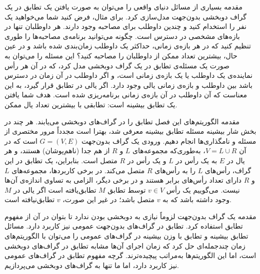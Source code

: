 \begin{itemframe}{مقدمه}
\itm
بسیاری از مسائل دنیای واقعی را می‌توان به صورت یافتن یک تطابق در یک گراف دوبخشی بدون‌جهت مدل‌سازی کرد.
\itm
برای مثال، فرض کنید شما می‌خواهید یک نفر را استخدام کنید و چندین داوطلب برای مصاحبه وجود دارند.
هر داوطلبان تنها در بازه‌های مشخصی در دسترس است. چگونه می‌توانید برنامه‌ی مصاحبه‌ها را طوری تنظیم کنید که در هر بازه‌ی زمانی، حداکثر یک داوطلب زمان‌بندی شده باشد و در عین حال، بیشترین تعداد ممکن از داوطلبان را مصاحبه کنید؟
\itm
 این مسئله را می‌توان به صورت یک مسئله‌ی تطابق در یک گراف دو‌بخشی مدل کرد، که در آن هر رأس نماینده‌ی یک داوطلب یا یک بازه‌ی زمانی است، و اگر داوطلب در آن زمان در دسترس باشد بین داوطلب و بازه‌ی زمانی یالی وجود دارد.
\itm
اگر یالی در تطابق قرار گیرد، به این معناست که آن داوطلب در آن بازه‌ی زمانی برنامه‌ریزی شده است. هدف شما یافتن یک تطابق بیشینه است: تطابقی با بیشترین تعداد یال ممکن.
\end{itemframe}

\begin{itemframe}{مقدمه}
\itm
الگوریتم‌های این فصل تطابق را در گراف‌های دو‌بخشی می‌یابند. هر چند در بخش شار بیشینه مسئله تطابق بیشینه معرفی شد، بهترا است مجدداً مرور مختصری از مسئله و نامگذاری‌ها انجام دهیم.
\itm
ورودی یک گراف بدون‌جهت $G = (V, E)$ است که در آن $V = L \cup R$، به‌طوری‌که مجموعه‌های $L$ و $R$ از هم جدا (ناهم‌پوشان) هستند، و هر یال در $E$ به یک رأس در $L$ و یک رأس در $R$ متصل است. بنابراین، یک تطابق در این گراف، رأس‌های $L$ را به رأس‌های $R$ متصل می‌کند.
\itm
در برخی کاربردها، مجموعه‌های $L$ و $R$ دارای تعداد رأس‌های برابر هستند و در برخی دیگر، الزامی به تساوی اندازه‌ی آن‌ها نیست.
\itm
می‌گوییم یک رأس $v \in V$ توسط تطابق $M$ تطابق‌یافته
 است اگر یالی در $M$ وجود داشته باشد که به $v$ متصل باشد؛ در غیر این صورت، $v$ تطابق‌نیافته
 است.
\end{itemframe}

\begin{itemframe}{مقدمه}
\itm
یک گراف بدون‌جهت لزوماً نیازی به دو‌بخشی بودن ندارد تا بتوان در آن از مفهوم تطابق استفاده کرد. تطابق در گراف‌های بدون‌جهت عمومی نیز کاربرد دارد.
\itm
مسائل تطابق بیشینه و تطابق با وزن بیشینه در گراف‌های عمومی را می‌توان با الگوریتم‌های زمان چندجمله‌ای حل کرد که زمان اجرای آن‌ها مشابه تطابق در گراف‌های دو‌بخشی است، اما این الگوریتم‌ها به‌مراتب پیچیده‌ترند.
\itm
 گرچه مفهوم تطابق در گراف‌های عمومی نیز کاربرد دارد، اما ما تنها به گراف‌های دو‌بخشی می‌پردازیم.
\end{itemframe}